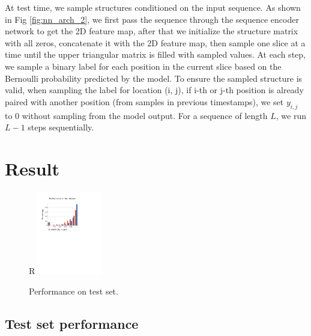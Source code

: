 \documentclass{article}
\begin{document}
At test time, we sample structures conditioned on the input sequence.
As shown in Fig \ref{fig:nn_arch_2}, we first pass the sequence through the
sequence encoder network to get the 2D feature map, after that
we initialize the structure matrix with all zeros, concatenate it with the 2D feature map,
then sample one slice at a time until the upper triangular matrix is filled with sampled values.
At each step, we sample a binary label for each position in the current slice based on the
Bernoulli probability predicted by the model.
To ensure the sampled structure is valid, when sampling the label for location (i, j),
if i-th or j-th position is already paired with another position (from samples in previous timestamps),
 we set $y_{i, j}$ to $0$ without sampling from the model output.
For a sequence of length $L$, we run $L-1$ steps sequentially.




\section{Result}


\begin{figure}{R}
    \centering
    \includegraphics[width=0.25\textwidth]{plot/performance_test_set.pdf}
    \caption{Performance on test set.}
    \label{fig:performance_test_set}
    \centering
\end{figure}

\subsection{Test set performance}
\end{document}
